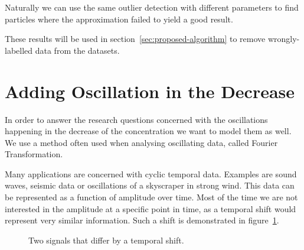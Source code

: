 Naturally we can use the same outlier detection with different parameters to find particles where the approximation failed to yield a good result.

These results will be used in section~\ref{sec:proposed-algorithm} to remove wrongly-labelled data from the datasets.

\section{Adding Oscillation in the Decrease}

In order to answer the research questions concerned with the oscillations happening in the decrease of the \Calcium concentration we want to model them as well. We use a method often used when analysing oscillating data, called Fourier Transformation.

Many applications are concerned with cyclic temporal data. Examples are sound waves, seismic data or oscillations of a skyscraper in strong wind. This data can be represented as a function of amplitude over time. Most of the time we are not interested in the amplitude at a specific point in time, as a temporal shift would represent very similar information. Such a shift is demonstrated in figure~\ref{fig:tempoal_shift}.

\begin{figure}
	\centering
	
	\begin{subfigure}[b]{\textwidth}
	\end{subfigure}
	
	\caption{Two signals that differ by a temporal shift.}
	\label{fig:tempoal_shift}
\end{figure}

